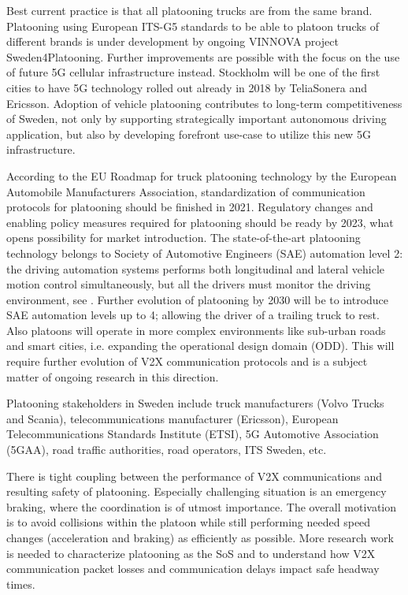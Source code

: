 Best current practice is that all platooning trucks are from the same brand. Platooning using European ITS-G5 standards to be able to platoon trucks of different brands is under development by ongoing VINNOVA project Sweden4Platooning. Further improvements are possible with the focus on the use of future 5G cellular infrastructure instead. Stockholm will be one of the first cities to have 5G technology rolled out already in 2018 by TeliaSonera and Ericsson. Adoption of vehicle platooning contributes to long-term competitiveness of Sweden, not only by supporting strategically important autonomous driving application, but also by developing forefront use-case to utilize this new 5G infrastructure.   

According to the EU Roadmap for truck platooning technology by the European Automobile Manufacturers Association, standardization of communication protocols for platooning should be finished in 2021. Regulatory changes and enabling policy measures required for platooning should be ready by 2023, what opens possibility for market introduction. The state-of-the-art platooning technology belongs to Society of Automotive Engineers (SAE) automation level 2: the driving automation systems performs both longitudinal and lateral vehicle motion control simultaneously, but all the drivers must monitor the driving environment, see \cite{sae2018taxonomy}. Further evolution of platooning by 2030 will be to introduce SAE automation levels up to 4; allowing the driver of a trailing truck to rest. Also platoons will operate in more complex environments like sub-urban roads and smart cities, i.e. expanding the operational design domain (ODD). This will require further evolution of V2X communication protocols and is a subject matter of ongoing research in this direction.

Platooning stakeholders in Sweden include truck manufacturers (Volvo Trucks and Scania), telecommunications manufacturer (Ericsson), European Telecommunications Standards Institute (ETSI), 5G Automotive Association (5GAA), road traffic authorities, road operators, ITS Sweden, etc.

There is tight coupling between the performance of V2X communications and resulting safety of platooning. Especially challenging situation is an emergency braking, where the coordination is of utmost importance. The overall motivation is to avoid collisions within the platoon while still performing needed speed changes (acceleration and braking) as efficiently as possible. More research work is needed to characterize platooning as the SoS and to understand how V2X communication packet losses and communication delays impact safe headway times.

